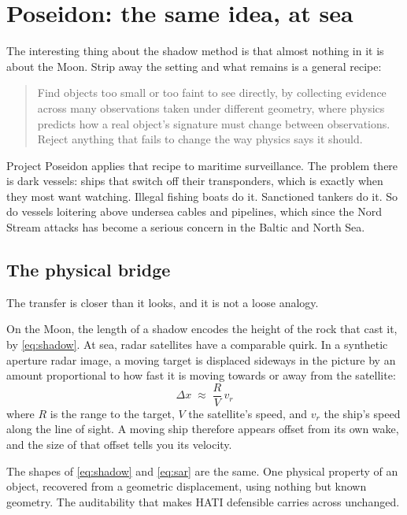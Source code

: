 \documentclass[11pt]{article}
\begin{document}
\section{Poseidon: the same idea, at sea}

The interesting thing about the shadow method is that almost nothing in it is about
the Moon. Strip away the setting and what remains is a general recipe:

\begin{quote}
Find objects too small or too faint to see directly, by collecting evidence across
many observations taken under different geometry, where physics predicts how a real
object's signature must change between observations. Reject anything that fails to
change the way physics says it should.
\end{quote}

Project Poseidon applies that recipe to maritime surveillance. The problem there is
dark vessels: ships that switch off their transponders, which is exactly when they
most want watching. Illegal fishing boats do it. Sanctioned tankers do it. So do
vessels loitering above undersea cables and pipelines, which since the Nord Stream
attacks has become a serious concern in the Baltic and North Sea.

\subsection{The physical bridge}

The transfer is closer than it looks, and it is not a loose analogy.

On the Moon, the length of a shadow encodes the height of the rock that cast it, by
\cref{eq:shadow}. At sea, radar satellites have a comparable quirk. In a synthetic
aperture radar image, a moving target is displaced sideways in the picture by an amount
proportional to how fast it is moving towards or away from the satellite:
\begin{equation}
\Delta x \;\approx\; \frac{R}{V}\,v_r
\label{eq:sar}
\end{equation}
where $R$ is the range to the target, $V$ the satellite's speed, and $v_r$ the ship's
speed along the line of sight. A moving ship therefore appears offset from its own
wake, and the size of that offset tells you its velocity.

The shapes of \cref{eq:shadow} and \cref{eq:sar} are the same. One physical property
of an object, recovered from a geometric displacement, using nothing but known
geometry. The auditability that makes HATI defensible carries across unchanged.
\end{document}
